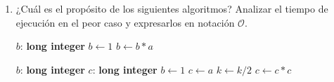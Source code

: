 \begin{enumerate}
\vspace*{15mm}


\begin{minipage}[t]{7cm}
\null 
 \begin{algorithm}[H]
\dontprintsemicolon %
$sum \gets 0$\;
 {
	 {
		 {
			$sum \gets sum + 1$
		}
	}
}
\caption{{} }
  \end{algorithm}
\end{minipage}%
\begin{minipage}[t]{7cm}
\null
 \begin{algorithm}[H]
\dontprintsemicolon %
$i \gets 1$\;
 {
	$j \gets 1$\;
	 {
		$j \gets j*2$
	}
	$i \gets i + 1$
}
\caption{{ } }
\end{algorithm}
\end{minipage}


\vspace*{15mm}


\begin{minipage}[t]{7cm}
\null 
 \begin{algorithm}[H]
\dontprintsemicolon %
$i \gets 1$\;
 {
	$j \gets 1$\;
	 {
		$j \gets j+1$
	}
	$i \gets i + 1$
}
\caption{{} }
  \end{algorithm}
\end{minipage}%
\begin{minipage}[t]{7cm}
\null
 \begin{algorithm}[H]
\dontprintsemicolon %
$i \gets 1$\;
 {
	$j \gets 1$\;
	 {
		$j \gets j+1$
	}
	$i \gets i + 2$
}
\caption{{ } }
\end{algorithm}
\end{minipage}

\newpage

	\item ¿Cuál es el propósito de los siguientes algoritmos? Analizar el tiempo de
	ejecución en el peor caso y expresarlos en notación $\mathcal{O}$.
		
\begin{minipage}[t]{7cm}
\null 
 \begin{algorithm}[H]
\dontprintsemicolon %
$b$: \textbf{long integer}\;
$b \gets 1$\;
 {
$b \gets b*a$
}
\caption{{} }
  \end{algorithm}
\end{minipage}%
\begin{minipage}[t]{7cm}
\null
 \begin{algorithm}[H]
\dontprintsemicolon %
$b$: \textbf{long integer}\;
$c$: \textbf{long integer}\;
$b \gets 1$\;
$c \gets a$\;
 {
   {
	$k \gets k / 2$\;
	$c \gets c*c$\;
  }
}
\caption{{ } }
\end{algorithm}
\end{minipage}


\end{enumerate}
